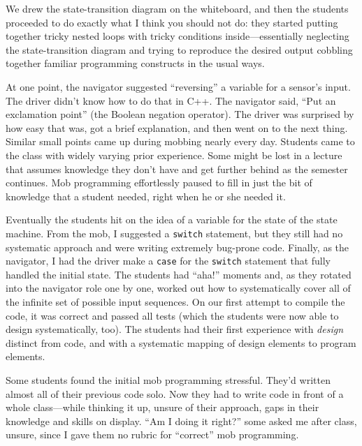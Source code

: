 \documentclass{article}
\begin{document}
We drew the state-transition diagram on the whiteboard, and then the students
proceeded to do exactly what I think you should not do: they started putting
together tricky nested loops with tricky conditions inside---essentially
neglecting the state-transition diagram and trying to reproduce the desired
output cobbling together familiar programming constructs in the usual ways.

At one point, the navigator suggested ``reversing'' a variable for a sensor's
input. The driver didn't know how to do that in C++. The navigator said, ``Put
an exclamation point'' (the Boolean negation operator). The driver was
surprised by how easy that was, got a brief explanation, and then went on to
the next thing. Similar small points came up during mobbing nearly every day.
Students came to the class with widely varying prior experience. Some might be
lost in a lecture that assumes knowledge they don't have and get further
behind as the semester continues.  Mob programming effortlessly paused to fill
in just the bit of knowledge that a student needed, right when he or she
needed it.


Eventually the students hit on the idea of a variable for the state of the
state machine. From the mob, I suggested a \texttt{switch} statement,
but they still had no systematic approach and were writing
extremely bug-prone code. Finally, as the navigator, I had the driver make a
\texttt{case} for the \texttt{switch} statement that fully handled the initial
state.  The students had ``aha!'' moments and, as they rotated into the
navigator role one by one, worked out how to systematically cover all of the
infinite set of possible input sequences. On our first attempt to compile the
code, it was correct and passed all tests (which the students were now able to
design systematically, too). The students had their first experience with
\emph{design} distinct from code, and with a systematic mapping of design
elements to program elements.

Some students found the initial mob programming stressful. They'd written
almost all of their previous code solo. Now they had to write code in front of
a whole class---while thinking it up, unsure of their approach, gaps in their
knowledge and skills on display. ``Am I doing it right?'' some asked me after
class, unsure, since I gave them no rubric for ``correct'' mob programming.
\end{document}
